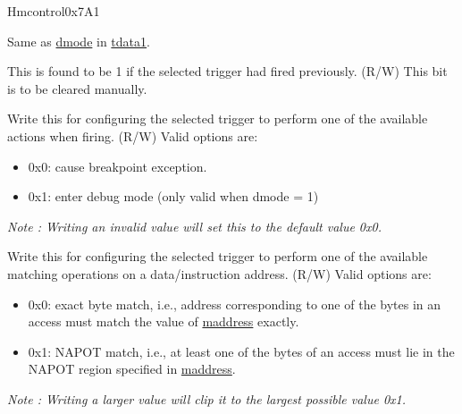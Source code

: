 \begin{register}{H}{mcontrol}{0x7A1}\label{regdesc:MCONTROL}
%
%
%
%
%
%
%
%
%
%
%
%
%
%
\regnewline%
\begin{regdesc}\begin{reglist}
\label{fielddesc:MCONTROLDMODE}\item [dmode] Same as \hyperref[fielddesc:TDATA1DMODE]{dmode} in \hyperref[regdesc:TDATA1]{tdata1}.
\label{fielddesc:MCONTROLHIT}\item [hit] This is found to be 1 if the selected trigger had fired previously. (R/W) \newline This bit is to be cleared manually.
\label{fielddesc:MCONTROLACTION}\item [action] Write this for configuring the selected trigger to perform one of the available actions when firing. (R/W)
\newline Valid options are:
\begin{itemize}
    \setlength\itemsep{-1em}
    \item 0x0: cause breakpoint exception.
    \item 0x1: enter debug mode (only valid when dmode = 1)
\end{itemize}
\textit{Note : Writing an invalid value will set this to the default value 0x0.}
\label{fielddesc:MCONTROLMATCH}\item [match] Write this for configuring the selected trigger to perform one of the available matching operations on a data/instruction address. (R/W)
Valid options are:
\begin{itemize}
    \setlength\itemsep{-1em}
    \item 0x0: exact byte match, i.e., address corresponding to one of the bytes in an access must match the value of \hyperref[regdesc:MADDRESS]{maddress} exactly.
    \item 0x1: NAPOT match, i.e., at least one of the bytes of an access must lie in the NAPOT region specified in \hyperref[regdesc:MADDRESS]{maddress}.
\end{itemize}
\textit{Note : Writing a larger value will clip it to the largest possible value 0x1.}

\end{reglist}
\end{regdesc}
\end{register}
